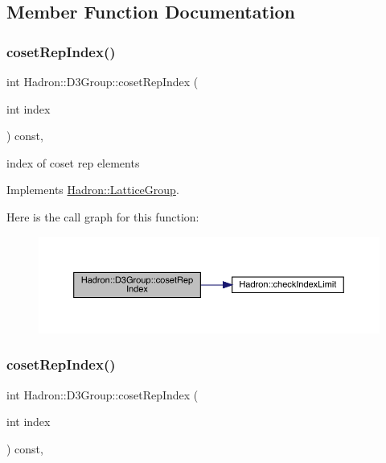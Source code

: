 \subsection{Member Function Documentation}
\mbox{\label{structHadron_1_1D3Group_a361cfe22330be972fe6d49bc2e1af871}} 
\subsubsection{\texorpdfstring{cosetRepIndex()}{cosetRepIndex()}\hspace{0.1cm}{\footnotesize\ttfamily [1/3]}}
{\footnotesize\ttfamily int Hadron\+::\+D3\+Group\+::coset\+Rep\+Index (\begin{DoxyParamCaption}\item[{int}]{index }\end{DoxyParamCaption}) const\hspace{0.3cm}{\ttfamily [inline]}, {\ttfamily [virtual]}}

index of coset rep elements 

Implements \mbox{\hyperlink{structHadron_1_1LatticeGroup_a7e3b9b5e2f596e6c40d64aa939a3ad6c}{Hadron\+::\+Lattice\+Group}}.

Here is the call graph for this function\+:
\nopagebreak
\begin{figure}[H]
\begin{center}
\leavevmode
\includegraphics[width=350pt]{de/de1/structHadron_1_1D3Group_a361cfe22330be972fe6d49bc2e1af871_cgraph}
\end{center}
\end{figure}
\mbox{\label{structHadron_1_1D3Group_a361cfe22330be972fe6d49bc2e1af871}} 
\subsubsection{\texorpdfstring{cosetRepIndex()}{cosetRepIndex()}\hspace{0.1cm}{\footnotesize\ttfamily [2/3]}}
{\footnotesize\ttfamily int Hadron\+::\+D3\+Group\+::coset\+Rep\+Index (\begin{DoxyParamCaption}\item[{int}]{index }\end{DoxyParamCaption}) const\hspace{0.3cm}{\ttfamily [inline]}, {\ttfamily [virtual]}}

